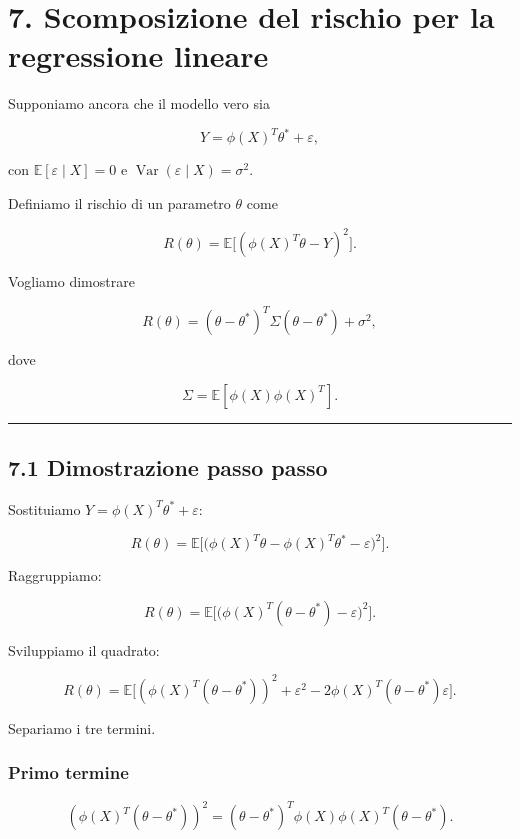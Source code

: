 \documentclass{article}
\begin{document}
\section{7. Scomposizione del rischio per la regressione
lineare}\label{scomposizione-del-rischio-per-la-regressione-lineare}

Supponiamo ancora che il modello vero sia

\[
Y = \phi(X)^T\theta^* + \varepsilon,
\]

con \(\mathbb{E}[\varepsilon\mid X]=0\) e
\(\operatorname{Var}(\varepsilon\mid X)=\sigma^2\).

Definiamo il rischio di un parametro \(\theta\) come

\[
R(\theta)=\mathbb{E}\big[(\phi(X)^T\theta - Y)^2\big].
\]

Vogliamo dimostrare

\[
R(\theta)=
(\theta-\theta^*)^T\Sigma(\theta-\theta^*)+\sigma^2,
\]

dove

\[
\Sigma=\mathbb{E}[\phi(X)\phi(X)^T].
\]

\begin{center}\rule{0.5\linewidth}{0.5pt}\end{center}

\subsection{7.1 Dimostrazione passo
passo}\label{dimostrazione-passo-passo-2}

Sostituiamo \(Y=\phi(X)^T\theta^*+\varepsilon\):

\[
R(\theta)
=
\mathbb{E}\Big[
\big(\phi(X)^T\theta - \phi(X)^T\theta^* - \varepsilon\big)^2
\Big].
\]

Raggruppiamo:

\[
R(\theta)
=
\mathbb{E}\Big[
\big(\phi(X)^T(\theta-\theta^*)-\varepsilon\big)^2
\Big].
\]

Sviluppiamo il quadrato:

\[
R(\theta)
=
\mathbb{E}\Big[
(\phi(X)^T(\theta-\theta^*))^2
+ \varepsilon^2
-2\phi(X)^T(\theta-\theta^*)\varepsilon
\Big].
\]

Separiamo i tre termini.

\subsubsection{Primo termine}\label{primo-termine}

\[
(\phi(X)^T(\theta-\theta^*))^2
=
(\theta-\theta^*)^T\phi(X)\phi(X)^T(\theta-\theta^*).
\]
\end{document}
